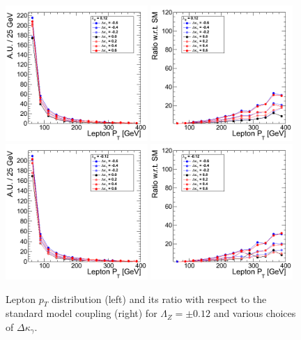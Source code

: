 \begin{figure}[h!t]
  {\centering
    \includegraphics[width=0.48\textwidth]{figs/LeptonpT_012.png}
    \includegraphics[width=0.48\textwidth]{figs/LeptonpT_012_ratio.png}
    \includegraphics[width=0.48\textwidth]{figs/LeptonpT_m012.png}
    \includegraphics[width=0.48\textwidth]{figs/LeptonpT_m012_ratio.png}
    \caption{Lepton $p_T$ distribution (left) and its ratio with respect to 
    the standard model coupling (right) for $\Lambda_Z = \pm 0.12$ and various choices of $\Delta{\kappa_\gamma}$.}
    \label{fig:ww_LeptonpT_atgcRatio012}}
\end{figure}
